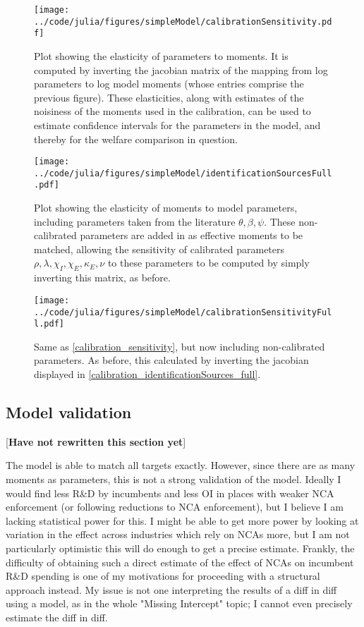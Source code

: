 \documentclass[11pt,english]{article}
\theoremstyle{remark}
\begin{document}
\begin{figure}[]
	\texttt{[image: ../code/julia/figures/simpleModel/calibrationSensitivity.pdf]}
	\caption{Plot showing the elasticity of parameters to moments. It is computed by inverting the jacobian matrix of the mapping from log parameters to log model moments (whose entries comprise the previous figure). These elasticities, along with estimates of the noisiness of the moments used in the calibration, can be used to estimate confidence intervals for the parameters in the model, and thereby for the welfare comparison in question.}
	\label{calibration_sensitivity}
\end{figure}

\begin{figure}[]
	\texttt{[image: ../code/julia/figures/simpleModel/identificationSourcesFull.pdf]}
	\caption{Plot showing the elasticity of moments to model parameters, including parameters taken from the literature $\theta , \beta, \psi$. These non-calibrated parameters are added in as effective moments to be matched, allowing the sensitivity of calibrated parameters $\rho, \lambda, \chi_I, \chi_E, \kappa_E, \nu$ to these parameters to be computed by simply inverting this matrix, as before.}
	\label{calibration_identificationSources_full}
\end{figure}

\begin{figure}[]
	\texttt{[image: ../code/julia/figures/simpleModel/calibrationSensitivityFull.pdf]}
	\caption{Same as \autoref{calibration_sensitivity}, but now including non-calibrated parameters. As before, this calculated by inverting the jacobian displayed in \autoref{calibration_identificationSources_full}.}
	\label{calibration_sensitivity_full}
\end{figure}

\subsection{Model validation} [\textbf{Have not rewritten this section yet}] 

The model is able to match all targets exactly. However, since there are as many moments as parameters, this is not a strong validation of the model. Ideally I would find less R\&D by incumbents and less OI in places with weaker NCA enforcement (or following reductions to NCA enforcement), but I believe I am lacking statistical power for this. I might be able to get more power by looking at variation in the effect across industries which rely on NCAs more, but I am not particularly optimistic this will do enough to get a precise estimate. Frankly, the difficulty of obtaining such a direct estimate of the effect of NCAs on incumbent R\&D spending is one of my motivations for proceeding with a structural approach instead. My issue is not one interpreting the results of a diff in diff using a model, as in the whole "Missing Intercept" topic; I cannot even precisely estimate the diff in diff. 
\end{document}
